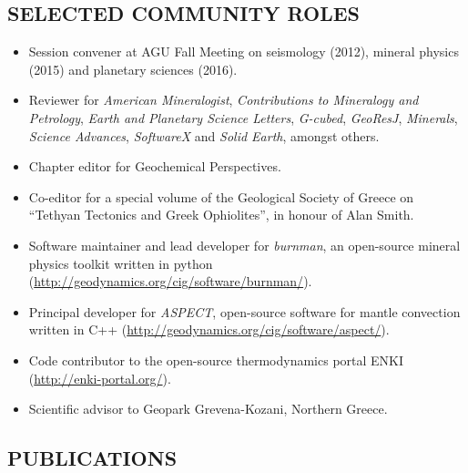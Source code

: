 \documentclass[11pt,twoside,a4paper]{article}
\begin{document}
\subsection*{SELECTED COMMUNITY ROLES}
\begin{itemize}
\item Session convener at AGU Fall Meeting on seismology (2012), mineral physics (2015) and planetary sciences (2016).
\item Reviewer for \emph{American Mineralogist}, \emph{Contributions to Mineralogy and Petrology}, \emph{Earth and Planetary Science Letters}, \emph{G-cubed}, \emph{GeoResJ}, \emph{Minerals}, \emph{Science Advances}, \emph{SoftwareX} and \emph{Solid Earth}, amongst others. %
\item Chapter editor for Geochemical Perspectives.
\item Co-editor for a special volume of the Geological Society of Greece on ``Tethyan Tectonics and Greek Ophiolites'', in honour of Alan Smith.
\item Software maintainer and lead developer for \emph{burnman}, an open-source mineral physics toolkit written in python (\url{http://geodynamics.org/cig/software/burnman/}).
\item Principal developer for \emph{ASPECT}, open-source software for mantle convection written in C++ (\url{http://geodynamics.org/cig/software/aspect/}).
\item Code contributor to the open-source thermodynamics portal ENKI \\(\url{http://enki-portal.org/}).
\item Scientific advisor to Geopark Grevena-Kozani, Northern Greece.
\end{itemize}

\clearpage
\subsection*{PUBLICATIONS}
\end{document}
